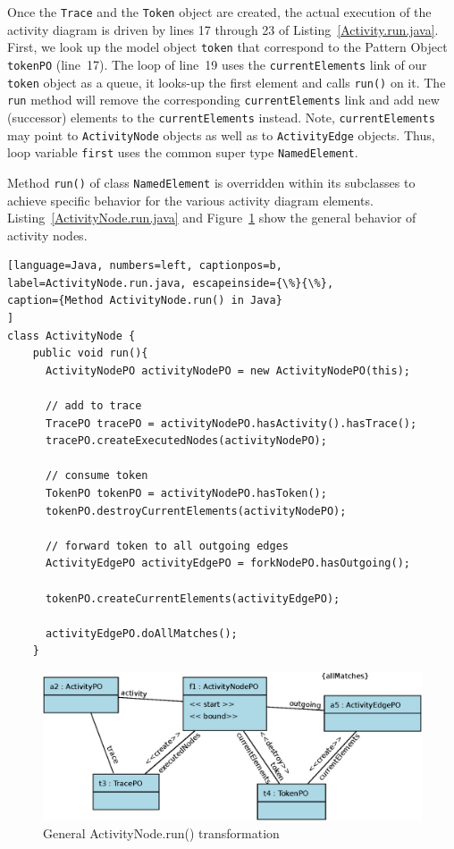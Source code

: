 \documentclass[submission,copyright,creativecommons]{eptcs}
\begin{document}
Once the \texttt{Trace} and the \texttt{Token} object are created, the actual execution 
of the activity diagram is driven by lines 17 through 23 of Listing~\ref{Activity.run.java}. 
First, we look up the model object \texttt{token} that correspond to the Pattern Object 
\texttt{tokenPO} (line~17). The loop of line~19 uses the \texttt{currentElements} link of our 
\texttt{token} object as a queue, it looks-up the first element and calls \texttt{run()} on it. 
The \texttt{run} method will remove the corresponding \texttt{currentElements} link and add 
new (successor) elements to the \texttt{currentElements} instead. Note, \texttt{currentElements}
may point to \texttt{ActivityNode} objects as well as to \texttt{ActivityEdge} objects. 
Thus, loop variable \texttt{first} uses the common super type \texttt{NamedElement}. 

Method \texttt{run()} of class \texttt{NamedElement} is overridden within its subclasses to achieve specific behavior for the various activity diagram elements. 
Listing~\ref{ActivityNode.run.java} and Figure~\ref{fig:ActivityNode.run} show the general behavior of activity nodes.

\begin{lstlisting}[language=Java, numbers=left, captionpos=b, 
label=ActivityNode.run.java, escapeinside={\%}{\%},
caption={Method ActivityNode.run() in Java}
]
class ActivityNode {
    public void run(){
      ActivityNodePO activityNodePO = new ActivityNodePO(this);
         
      // add to trace
      TracePO tracePO = activityNodePO.hasActivity().hasTrace();
      tracePO.createExecutedNodes(activityNodePO);

      // consume token
      TokenPO tokenPO = activityNodePO.hasToken();
      tokenPO.destroyCurrentElements(activityNodePO);
         
      // forward token to all outgoing edges
      ActivityEdgePO activityEdgePO = forkNodePO.hasOutgoing();

      tokenPO.createCurrentElements(activityEdgePO);
         
      activityEdgePO.doAllMatches();
    }
\end{lstlisting}

\begin{figure}[ht] \centering
	\includegraphics[width=\linewidth]{images/ActivityNode.run.eps}
 \caption{General ActivityNode.run() transformation}
 \label{fig:ActivityNode.run}
\end{figure}
\end{document}
